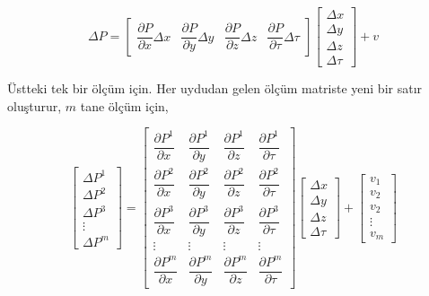 \documentclass[12pt,fleqn]{article}\usepackage{../../common}
\begin{document}
$$ 
\Delta P = \left[\begin{array}{cccc}
\dfrac{\partial P}{\partial x} \Delta x & 
\dfrac{\partial P}{\partial y} \Delta y & 
\dfrac{\partial P}{\partial z} \Delta z & 
\dfrac{\partial P}{\partial \tau} \Delta \tau
\end{array}\right]
\left[\begin{array}{c}
\Delta x \\ \Delta y \\ \Delta z \\ \Delta \tau 
\end{array}\right] + v
$$

Üstteki tek bir ölçüm için. Her uydudan gelen ölçüm matriste yeni bir satır
oluşturur, $m$ tane ölçüm için,

$$ 
\begin{bmatrix}
\Delta P^1 \\[1ex]
\Delta P^2 \\[1ex] 
\Delta P^3 \\[1ex] 
\vdots \\[1ex]
\Delta P^m 
\end{bmatrix}
= 
\begin{bmatrix}
\dfrac{\partial P^1}{\partial x} & 
\dfrac{\partial P^1}{\partial y} & 
\dfrac{\partial P^1}{\partial z} & 
\dfrac{\partial P^1}{\partial \tau}
\\[2ex]
\dfrac{\partial P^2}{\partial x} & 
\dfrac{\partial P^2}{\partial y} & 
\dfrac{\partial P^2}{\partial z} & 
\dfrac{\partial P^2}{\partial \tau}
\\[2ex]
\dfrac{\partial P^3}{\partial x} & 
\dfrac{\partial P^3}{\partial y} & 
\dfrac{\partial P^3}{\partial z} & 
\dfrac{\partial P^3}{\partial \tau} 
\\[2ex]
\vdots & \vdots & \vdots & \vdots \\[2ex]
\dfrac{\partial P^m}{\partial x} & 
\dfrac{\partial P^m}{\partial y} & 
\dfrac{\partial P^m}{\partial z} & 
\dfrac{\partial P^m}{\partial \tau} 
\end{bmatrix} 
\begin{bmatrix}
\Delta x \\[1ex]
\Delta y \\[1ex] 
\Delta z \\[1ex] 
\Delta \tau
\end{bmatrix} + 
\begin{bmatrix}
v_1 \\[1ex]
v_2 \\[1ex] 
v_2 \\[1ex] 
\vdots \\[1ex] 
v_m
\end{bmatrix}
$$
\end{document}
